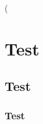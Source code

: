 \documentclass{article}
\begin{document}
\bigg( \ll \\

\alpha \beta \gamma \delta
\forall \exists \partial \infty
\int \iint \iiint \oint
\to \leftarrow \rightarrow \leftrightarrow
\Leftarrow \Rightarrow \Leftrightarrow
{}    
  
\in \notin \subset \supset \cup \cap
\section{Test} \subsection{Test} \subsubsection{Test}
\end{document}
